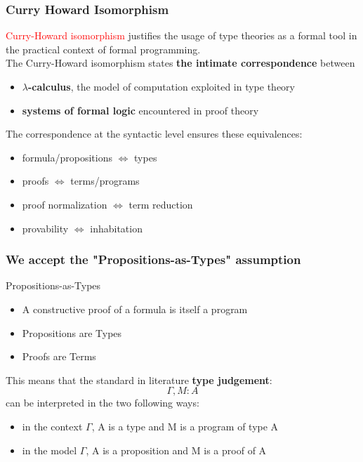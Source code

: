 \begin{frame}
\frametitle{Curry Howard Isomorphism}
\textcolor{red}{Curry-Howard isomorphism} justifies the usage of type theories as a formal tool in the practical context of formal programming.
\\ \medskip
The Curry-Howard isomorphism states \textbf{the intimate correspondence} between
\begin{itemize}
  \item \textbf{$\lambda$-calculus}, the model of computation exploited in type theory
  \item \textbf{systems of formal logic} encountered in proof theory 
\end{itemize} 
\medskip
\pause
The correspondence at the syntactic level ensures these equivalences:
\begin{itemize}
	\frametitle{Curry-Howad Isomorphism}
	\item formula/propositions $ \Leftrightarrow $ types
	\item proofs $ \Leftrightarrow $ terms/programs
	\item proof normalization $ \Leftrightarrow $ term reduction
	\item provability $ \Leftrightarrow $ inhabitation
\end{itemize}
\end{frame}


\begin{frame}
\frametitle{We accept the "Propositions-as-Types" assumption}
\begin{block}{Propositions-as-Types}
\begin{itemize}
	\item A constructive proof of a formula is itself a program
	\item Propositions are Types
	\item Proofs are Terms
\end{itemize}
\end{block} 
This means that the standard in literature \textbf{type judgement}: 
\[ \varGamma, M : A \] 
can be interpreted in the two following ways:
\begin{itemize}
\item in the context $\varGamma$, A is a type and M is a program of type A
\item in the model $\varGamma$, A is a proposition and M is a proof of A
\end{itemize}
\end{frame}


